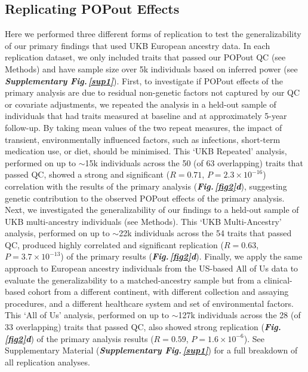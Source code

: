 \documentclass[12pt]{zHenriquesLab-StyleBioRxiv}
\newcommand\dref[2]{\normalsize{\textbf{\textit{Fig.\,\ref{#1}#2}}}\normalsize{}}
\newcommand\sref[1]{\normalsize{\textbf{\textit{Supplementary Fig.\,\ref{#1}}}}\normalsize{}}
\begin{document}
{{\subsection*{Replicating POPout Effects} \label{sec:res1}
Here we performed three different forms of replication to test the generalizability of our primary 
findings that used UKB European ancestry data. In each replication dataset, 
we only included traits that passed our POPout QC (see Methods) and have sample size 
over 5k individuals based on inferred power (see \sref{sup1}). First, 
to investigate if POPout effects of the primary analysis are due to residual 
non-genetic factors not captured by our QC or covariate adjustments, we repeated 
the analysis in a held-out sample of individuals that had traits measured at 
baseline and at approximately 5-year follow-up. By taking mean values of the 
two repeat measures, the impact of transient, environmentally influenced factors, 
such as infections, short-term medication use, or diet, should be minimised. 
This ‘UKB Repeated’ analysis, performed on up to $\sim$15k individuals across the 
50 (of 63 overlapping) traits that passed QC, showed a strong and 
significant ($R=0.71$, $P=2.3 \times 10^{-16}$) correlation with the results 
of the primary analysis (\dref{fig2}{d}), suggesting genetic contribution to the 
observed POPout effects of the primary analysis. Next, we investigated the generalizability 
of our findings to a held-out sample of UKB multi-ancestry individuals (see Methods). 
This ‘UKB Multi-Ancestry’ analysis, performed on up to $\sim$22k individuals across the 
54 traits that passed QC, produced highly correlated and significant 
replication ($R=0.63$, $P=3.7 \times 10^{-13}$) of the primary results (\dref{fig2}{d}). 
Finally, we apply the same approach to European ancestry individuals from the 
US-based All of Us data \cite{Bick2024} to evaluate the generalizability to a matched-ancestry 
sample but from a clinical-based cohort from a different continent, with different 
collection and assaying procedures, and a different healthcare system and set of 
environmental factors. This ‘All of Us’ analysis, performed on up to $\sim$127k individuals 
across the 28 (of 33 overlapping) traits that passed QC, also showed strong replication (\dref{fig2}{d}) of the primary 
analysis results ($R=0.59$, $P=1.6 \times 10^{-6}$). 
See Supplementary Material (\sref{sup1}) for a full breakdown of all replication analyses. 
%
%
}}
\end{document}
